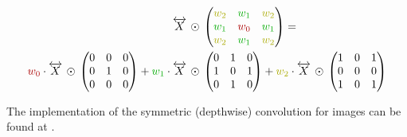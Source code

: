 \begin{equation}
    \label{eq:how-to-compute-symm-conv}
    \begin{split}
        \overleftrightarrow{X} &\,\odot\, \left(\begin{matrix}
            \textcolor{textyellow}{w_2} & \textcolor{textgreen}{w_1} & \textcolor{textyellow}{w_2}\\
            \textcolor{textgreen}{w_1} & \textcolor{textred}{w_0} & \textcolor{textgreen}{w_1}\\
            \textcolor{textyellow}{w_2} & \textcolor{textgreen}{w_1} & \textcolor{textyellow}{w_2}\\
        \end{matrix}\right) = \\
        \textcolor{textred}{w_0}\cdot \overleftrightarrow{X} \,\odot\, \left(\begin{matrix}
            0&0&0\\
            0&1&0\\
            0&0&0\\
        \end{matrix}\right)+
        \textcolor{textgreen}{w_1}\cdot \overleftrightarrow{X} &\,\odot\, \left(\begin{matrix}
            0&1&0\\
            1&0&1\\
            0&1&0\\
        \end{matrix}\right)+
        \textcolor{textyellow}{w_2}\cdot \overleftrightarrow{X} \,\odot\, \left(\begin{matrix}
            1&0&1\\
            0&0&0\\
            1&0&1\\
        \end{matrix}\right)
    \end{split}
\end{equation}


The implementation of the symmetric (depthwise) convolution for images can be found at .